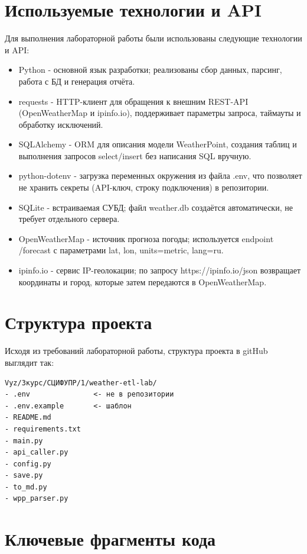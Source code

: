 \documentclass[oneside,a4paper,14pt]{extarticle}
\begin{document}
\section*{Используемые технологии и API}
Для выполнения лабораторной работы были использованы следующие технологии и API:
\begin{itemize}
	\item Python - основной язык разработки; реализованы сбор данных, парсинг, работа с БД и генерация отчёта.
	\item requests - HTTP-клиент для обращения к внешним REST-API (OpenWeatherMap и ipinfo.io), поддерживает параметры запроса, таймауты и обработку исключений.
	\item SQLAlchemy - ORM для описания модели WeatherPoint, создания таблиц и выполнения запросов select/insert без написания SQL вручную.
	\item python-dotenv - загрузка переменных окружения из файла .env, что позволяет не хранить секреты (API-ключ, строку подключения) в репозитории.
	\item SQLite - встраиваемая СУБД; файл weather.db создаётся автоматически, не требует отдельного сервера.
	\item OpenWeatherMap - источник прогноза погоды; используется endpoint /forecast с параметрами lat, lon, units=metric, lang=ru.
	\item ipinfo.io - сервис IP-геолокации; по запросу https://ipinfo.io/json возвращает координаты и город, которые затем передаются в OpenWeatherMap.
\end{itemize}

\section*{Структура проекта}
Исходя из требований лабораторной работы, структура проекта в gitHub выглядит так:

\begin{small}
	\begin{verbatim}
Vyz/3курс/СЦИФУПР/1/weather-etl-lab/
- .env               <- не в репозитории
- .env.example       <- шаблон
- README.md
- requirements.txt
- main.py
- api_caller.py
- config.py
- save.py
- to_md.py
- wpp_parser.py
\end{verbatim}
\end{small}

\section*{Ключевые фрагменты кода}
\end{document}
